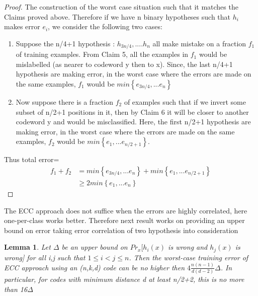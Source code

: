 \documentclass[11pt]{article}
\newtheorem{lemma}[theorem]{Lemma}
\begin{document}
    \begin{proof}
    The construction of the worst case situation such that it matches the Claims proved above. Therefore if we have n binary hypotheses such that $h_i$ makes error $e_i$, we consider the following two cases:
    \begin{enumerate}
        \item Suppose the n/4+1 hypothesis : $h_{3n/4},....h_{n}$ all make mistake on a fraction $f_1$ of training examples. From Claim 5, all the examples in $f_1$ would be mislabelled (as nearer to codeword y then to x).
        Since, the last n/4+1 hypothesis are making error, in the worst case where the errors are made on the same examples, $f_1$ would be $min\left\{e_{3n/4},...e_n\right\}$
        \item Now suppose there is a fraction $f_2$ of examples such that if we invert some subset of n/2+1 positions in it, then by Claim 6 it will be closer to another codeword y and would be misclassified. Here, the first n/2+1 hypothesis are making error, in the worst case where the errors are made on the same examples, $f_2$ would be $min\left\{e_{1},...e_{n/2+1}\right\}$.
    \end{enumerate}
    Thus total error=
    \begin{align*}
        f_1+f_2 &= min\left\{e_{3n/4},...e_n\right\}+min\left\{e_{1},...e_{n/2+1}\right\}\\
            &\geq 2  min\left\{e_1,...e_n\right\}
    \end{align*}
    \end{proof}
    The ECC approach does not suffice when the errors are highly correlated, here one-per-class works better. Therefore next result works on providing an upper bound on error taking error correlation of two hypothesis into consideration
    \begin{lemma} 
        Let $\Delta$ be an upper bound on $Pr_x[h_i(x)$ is wrong and $h_j(x)$ is wrong] for all i,j such that $1 \leq i <j \leq n$. Then the worst-case training error of ECC approach using an (n,k,d) code can be no higher then $4\frac{n(n-1)}{d(d-2)}\Delta$. In particular, for codes with minimum distance d at least n/2+2, this is no more than 16$\Delta$\\
    \end{lemma} 
\end{document}
